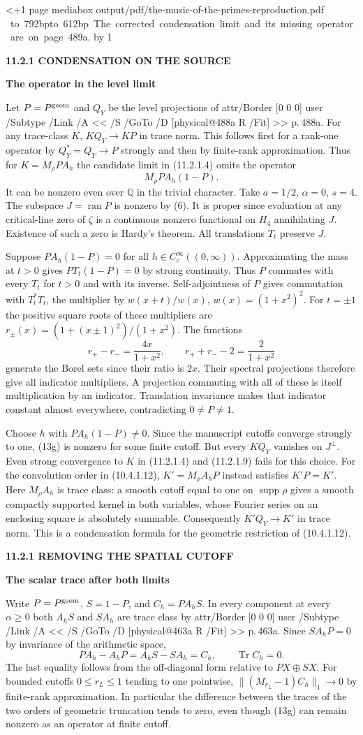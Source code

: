 \documentclass[11pt,letterpaper]{article}
\makeatletter
\newcommand{\rightmarktext}{}
\newcommand{\printfolio}{}
\newcommand{\leaf}[4]{\clearpage\gdef\printfolio{#1}\gdef\rightmarktext{#2}%
  {\small\sffamily\bfseries\color{ink}#3\par}\vspace{3pt}%
  {\LARGE\bfseries #4\par}\vspace{5pt}}
\newcommand{\Q}{\mathbb Q}
\DeclareMathOperator{\Tr}{Tr}
\DeclareMathOperator{\supp}{supp}
\newcommand{\baselinePDF}{output/pdf/the-music-of-the-primes-reproduction.pdf}
\newcommand{\MusicPDFPageRef}[1]{\pdfpageref\csname physical@#1\endcsname\space\space 0 R}
\newcommand{\pagelink}[2]{\leavevmode\pdfstartlink attr{/Border [0 0 0]} user{%
  /Subtype /Link /A << /S /GoTo /D [\MusicPDFPageRef{#1} /Fit] >>}%
  {\color{ink}#2}\pdfendlink}
\newcommand{\pg}[1]{\pagelink{#1}{p.\,#1}}
\newcommand{\sourcepages}[3]{\clearpage
  \begingroup
  \pdfhorigin=0pt \pdfvorigin=0pt
  \originalfolio=#1\relax
  \loop\ifnum\originalfolio<\numexpr#2+1\relax
    \pdfximage page \originalfolio\space mediabox {\baselinePDF}%
    \edef\pageimage{\the\pdflastximage}%
    \edef\pageattributes{\ifcsname MusicPDFAnnotations\the\originalfolio\endcsname
      \csname MusicPDFAnnotations\the\originalfolio\endcsname\fi}%
    \expandafter\pdfpageattr\expandafter{\pageattributes}%
    \shipout\hbox{\rlap{\pdfrefximage\pageimage}%
      \vbox to 792bp{\kern 15bp\hbox to 612bp{\hfil
        {\footnotesize\sffamily\color{ink}#3}\hfil}\vss}}%
    \advance\originalfolio by 1 \stepcounter{page}%
  \repeat
  \endgroup\pdfpageattr{}}
\makeatother
\begin{document}
\sourcepages{489}{489}{The corrected condensation limit and its missing operator are on page 489a.}
\leaf{489a}{The geometric projection}{11.2.1 \quad CONDENSATION ON THE SOURCE}{The operator in the level limit}
Let $P=P^{\rm geom}$ and $Q_Y$ be the level projections of \pg{488a}.
For any trace-class $K$, $KQ_Y\to KP$ in trace norm. This follows first
for a rank-one operator by $Q_Y^*=Q_Y\to P$ strongly and then by
finite-rank approximation. Thus for $K=M_\rho P A_h$ the candidate
limit in (11.2.1.4) omits the operator
\[
                         M_\rho P A_h(1-P).
 \tag{13g}
\]
It can be nonzero even over $\Q$ in the trivial character. Take
$a=1/2$, $\alpha=0$, $s=4$. The subspace $J=\operatorname{ran}P$ is
nonzero by (6). It is proper since evaluation at any critical-line
zero of $\zeta$ is a continuous nonzero functional on $H_4$ annihilating
$J$. Existence of such a zero is Hardy's theorem. All translations
$T_t$ preserve $J$.

Suppose $PA_h(1-P)=0$ for all $h\in C_c^\infty((0,\infty))$.
Approximating the mass at $t>0$ gives $PT_t(1-P)=0$ by strong
continuity. Thus $P$ commutes with every $T_t$ for $t>0$ and with its
inverse. Self-adjointness of $P$ gives commutation with
$T_t^*T_t$, the multiplier by $w(x+t)/w(x)$,
$w(x)=(1+x^2)^2$. For $t=\pm1$ the positive square roots of these
multipliers are $r_\pm(x)=(1+(x\pm1)^2)/(1+x^2)$. The functions
\[
       r_+-r_-=\frac{4x}{1+x^2},\qquad
       r_++r_--2=\frac{2}{1+x^2}
\]
generate the Borel sets since their ratio is $2x$. Their spectral
projections therefore give all indicator multipliers. A projection
commuting with all of these is itself multiplication by an indicator.
Translation invariance makes that indicator constant almost everywhere,
contradicting $0\ne P\ne1$.

Choose $h$ with $PA_h(1-P)\ne0$. Since the manuscript cutoffs converge
strongly to one, (13g) is nonzero for some finite cutoff. But every
$KQ_Y$ vanishes on $J^\perp$. Even strong convergence to $K$ in
(11.2.1.4) and (11.2.1.9) fails for this choice. For the convolution
order in (10.4.1.12), $K'=M_\rho A_hP$ instead satisfies $K'P=K'$.
Here $M_\rho A_h$ is trace class: a smooth cutoff equal to one on
$\supp\rho$ gives a smooth compactly supported kernel in both variables,
whose Fourier series on an enclosing square is absolutely summable.
Consequently $K'Q_Y\to K'$ in trace norm. This is a condensation
formula for the geometric restriction of (10.4.1.12).

\leaf{489b}{The geometric projection}{11.2.1 \quad REMOVING THE SPATIAL CUTOFF}{The scalar trace after both limits}
Write $P=P^{\rm geom}$, $S=1-P$, and
$C_h=PA_hS$. In every component at every $\alpha\ge0$ both $A_hS$ and
$SA_h$ are trace class by \pg{463a}.
Since $SA_hP=0$ by invariance of the arithmetic space,
\[
         PA_h-A_hP=A_hS-SA_h=C_h,\qquad \Tr C_h=0 .
 \tag{13h}
\]
The last equality follows from the off-diagonal form relative to
$PX\oplus SX$. For bounded cutoffs $0\le r_L\le1$ tending to one
pointwise, $\|(M_{r_L}-1)C_h\|_1\to0$ by finite-rank approximation.
In particular the difference between the traces of the two orders of
geometric truncation tends to zero, even though (13g) can remain nonzero
as an operator at finite cutoff.
\end{document}
